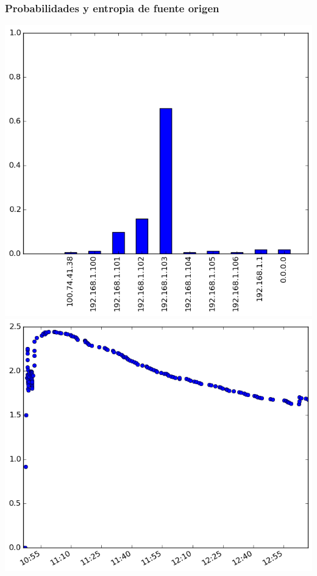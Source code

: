 \subsubsection{Probabilidades y entropia de fuente origen}
\includegraphics[scale=0.33]{../experimentacion-svilerino/casa/histogram_src_probabilities.png}
\includegraphics[scale=0.33]{../experimentacion-svilerino/casa/entropy_src.png}


